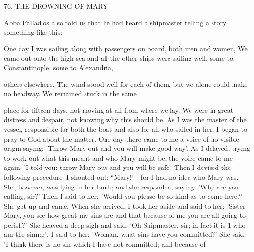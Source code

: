 76. THE DROWNING OF MARY

Abba Palladios also told us that he had heard a shipmaster telling
a story something like this:

One day I was sailing along with passengers on board, both men
and women, We came out onto the high sea and all the other ships
were sailing well, some to Constantinople, some to Alexandria,

others elsewhere. The wind stood well for each of them, but we
alone could make no headway. We remained stuck in the same

place for fifteen days, not moving at all from where we lay. We
were in great distress and despair, not knowing why this should be.
As I was the master of the vessel, responsible for both the boat and
also for all who sailed in her, I began to pray to God about the
matter. One day there came to me a voice of no visible origin
saying: 'Throw Mary out and you will make good way'. As I
delayed, trying to work out what this meant and who Mary might
be, the voice came to me again: 'I told you: throw Mary out and
you will be safe'. Then I devised the following procedure. I shouted
out: “Mary!'—for I had no idea who Mary was. She, however, was
lying in her bunk; and she responded, saying: 'Why are you calling,
sir?' Then I said to her: 'Would you please be so kind as to come
here?' She got up and came, When she arrived, I took her aside and
said to her: 'Sister Mary, you see how great my sins are and that
because of me you are all going to perish?' She heaved a deep sigh
and said: 'Oh Shipmaster, sir; in fact it is 1 who am the sinner', I
said to her: 'Woman, what sins have you committed?' She said: 'I
think there is no sin which I have not committed; and because of
